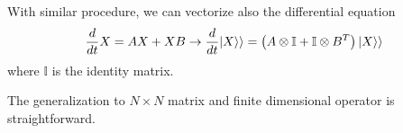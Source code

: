 With similar procedure, we can vectorize also the differential equation
\begin{equation}
    \frac{d}{dt}X = AX + XB \rightarrow \frac{d}{dt}\lvert X\rangle\rangle = \left(A\otimes \mathbb{I} + \mathbb{I} \otimes B^T\right)\lvert X\rangle\rangle
\end{equation}
where $\mathbb{I}$ is the identity matrix.

The generalization to $N \times N$ matrix and finite dimensional operator is straightforward.